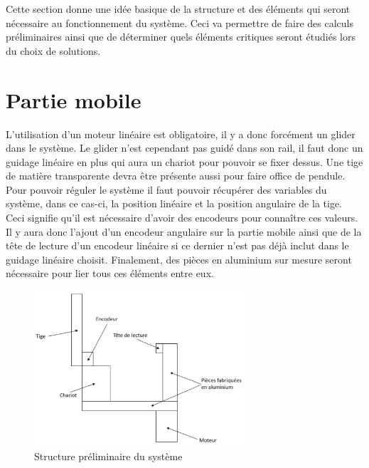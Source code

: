 Cette section donne une idée basique de la structure et des éléments qui seront nécessaire au fonctionnement du système.
Ceci va permettre de faire des calculs préliminaires ainsi que de déterminer quels éléments critiques seront étudiés lors du choix
de solutions.

\section{Partie mobile}\label{sec:PartMob}
L'utilisation d'un moteur linéaire est obligatoire, il y a donc forcément un \gls{glider} dans le système. Le \gls{glider} n'est cependant
pas guidé dans son rail, il faut donc un guidage linéaire en plus qui aura un chariot pour pouvoir se fixer dessus. Une tige de matière
transparente devra être présente aussi pour faire office de pendule. Pour pouvoir réguler le système il faut pouvoir récupérer des variables
du système, dans ce cas-ci, la position linéaire et la position angulaire de la tige. Ceci signifie qu'il est nécessaire d'avoir des encodeurs
pour connaître ces valeurs. Il y aura donc l'ajout d'un encodeur angulaire sur la partie mobile ainsi que de la tête de lecture d'un encodeur
linéaire si ce dernier n'est pas déjà inclut dans le guidage linéaire choisit. Finalement, des pièces en aluminium sur mesure seront nécessaire
pour lier tous ces éléments entre eux.

\begin{figure}[H]
    \centering
    \includegraphics[width = 0.7\textwidth]{assets/figures/StructPrelim.svg}
    \caption{Structure préliminaire du système}
    \label{fig:StructPrelim}
\end{figure}